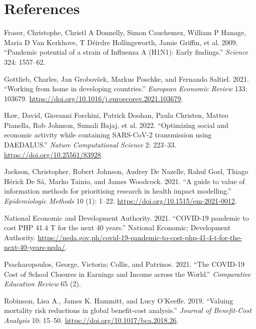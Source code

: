 \documentclass[
]{article}
\newlength{\cslhangindent}
\newlength{\cslentryspacingunit} %
\newenvironment{CSLReferences}[2] %
 {%
  \setlength{\parindent}{0pt}
  \ifodd #1
  \let\oldpar\par
  \def\par{\hangindent=\cslhangindent\oldpar}
  \fi
  \setlength{\parskip}{#2\cslentryspacingunit}
 }%
 {}
\begin{document}
\newpage

\hypertarget{references}{%
\section{References}\label{references}}

\hypertarget{refs}{}
\begin{CSLReferences}{1}{0}
\leavevmode{}%
Fraser, Christophe, Christl A Donnelly, Simon Cauchemez, William P Hanage, Maria D Van Kerkhove, T Déirdre Hollingsworth, Jamie Griffin, et al. 2009. {``{Pandemic potential of a strain of Influenza A (H1N1): Early findings}.''} \emph{Science} 324: 1557--62.

\leavevmode{}%
Gottlieb, Charles, Jan Grobovšek, Markus Poschke, and Fernando Saltiel. 2021. {``{Working from home in developing countries}.''} \emph{European Economic Review} 133: 103679. \url{https://doi.org/10.1016/j.euroecorev.2021.103679}.

\leavevmode{}%
Haw, David, Giovanni Forchini, Patrick Doohan, Paula Christen, Matteo Pianella, Rob Johnson, Sumali Bajaj, et al. 2022. {``{Optimizing social and economic activity while containing SARS-CoV-2 transmission using DAEDALUS}.''} \emph{Nature Computational Science} 2: 223--33. \url{https://doi.org/10.25561/83928}.

\leavevmode{}%
Jackson, Christopher, Robert Johnson, Audrey De Nazelle, Rahul Goel, Thiago Hérick De Sá, Marko Tainio, and James Woodcock. 2021. {``{A guide to value of information methods for prioritising research in health impact modelling}.''} \emph{Epidemiologic Methods} 10 (1): 1--22. \url{https://doi.org/10.1515/em-2021-0012}.

\leavevmode{}%
National Economic and Development Authority. 2021. {``{COVID-19 pandemic to cost PHP 41.4 T for the next 40 years}.''} National Economic; Development Authority. \url{https://neda.gov.ph/covid-19-pandemic-to-cost-php-41-4-t-for-the-next-40-years-neda/}.

\leavevmode{}%
Psacharopoulos, George, Victoria; Collis, and Patrinos. 2021. {``{The COVID-19 Cost of School Closures in Earnings and Income across the World}.''} \emph{Comparative Education Review} 65 (2).

\leavevmode{}%
Robinson, Lisa A., James K. Hammitt, and Lucy O'Keeffe. 2019. {``{Valuing mortality risk reductions in global benefit-cost analysis}.''} \emph{Journal of Benefit-Cost Analysis} 10: 15--50. \url{https://doi.org/10.1017/bca.2018.26}.

\end{CSLReferences}
\end{document}
